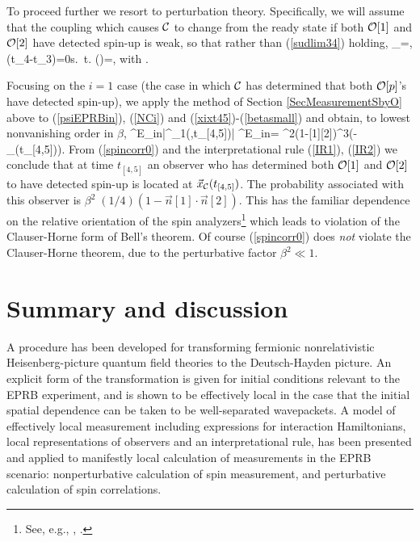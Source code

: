 \documentclass[12pt]{article}
\begin{document}
To proceed further we resort to perturbation theory. Specifically, we will assume that the coupling which
causes  $\cC$\/ to change from the ready state if both $\cO[1]$\/ and $\cO[2]$\/ have detected spin-up  is weak, so that rather than (\ref{sudlim34}) holding, 
\be
\lim \kp_\cC =\infty,\;\;\;\lim(t_4-t_3)=0\;\;\;\mbox{\rm s. t.} \;\;\;\lim\left(\right)=\beta,
\label{sudlim340}
\ee
{}
with
\be
\beta {}.
\label{betasmall}
\ee
{}


Focusing on the $i=1$\/ case (the case in which $\cC$\/ has determined that both $\cO[p]$\/'s have detected spin-up), we apply the method of  Section  \ref{SecMeasurementSbyO} above to (\ref{psiEPRBin}), (\ref{NCi}) and (\ref{xixt45})-(\ref{betasmall})  and obtain,
to lowest nonvanishing order in $\beta$\/,
\be
\la \psi^E_{in}|\wh{\cN}^\cC_1(,t_{[4,5]})| \psi^E_{in}\ra=
\beta^2\;\left(1-[1]\cdot{}[2]\right)\;\delta^3(-_{\cC}(t_{[4,5]})).
\label{spincorr0}
\ee
{}
From (\ref{spincorr0}) and the interpretational rule (\ref{IR1}),  (\ref{IR2}) we conclude that at time $t_{[4,5]}$\/
an observer who has determined both $\cO[1]$\/ and $\cO[2]$\/ to  have detected spin-up is located at $\vec{x}_{\cC}(t_{[4,5]})$\/.
The probability associated with this 
observer is $\beta^2\;(1/4)(1-\vec{n}[1]\cdot\vec{n}[2])$\/. 
This has the familiar dependence on the relative orientation of the spin analyzers\footnote{See, e.g., \cite{Greenberger_etal90},
\cite{Fryetal95}.} which leads to violation of 
the Clauser-Horne \cite{ClauserHorne74} form of Bell's theorem. Of course (\ref{spincorr0}) does {\em not}\/ violate the
Clauser-Horne theorem, due to the perturbative factor  $\beta^2 \ll 1$\/.



\section{Summary and discussion}\label{SecDiscussion}

A procedure has been developed for transforming fermionic nonrelativistic Heisenberg-picture quantum field theories to the
Deutsch-Hayden picture. An explicit form of the transformation is given for initial conditions relevant to the EPRB experiment, and is shown to be  effectively local in the case that the initial spatial dependence can be taken to be well-separated wavepackets.  A model of effectively local measurement  including
expressions  for  interaction Hamiltonians, local representations of observers  and an interpretational rule, has been presented and applied to manifestly local
calculation of measurements in the EPRB scenario: nonperturbative calculation
of spin measurement, and perturbative calculation of spin correlations.
\end{document}
